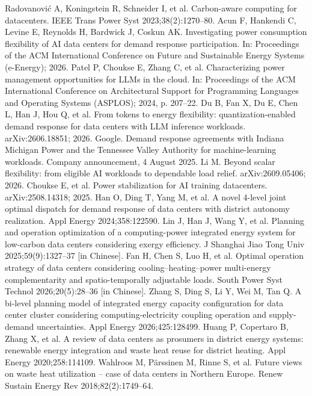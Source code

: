  Radovanovi\'c A, Koningstein R, Schneider I, et al. Carbon-aware computing for datacenters. IEEE Trans Power Syst 2023;38(2):1270--80.
 Acun F, Hankendi C, Levine E, Reynolds H, Bardwick J, Coskun AK. Investigating power consumption flexibility of AI data centers for demand response participation. In: Proceedings of the ACM International Conference on Future and Sustainable Energy Systems (e-Energy); 2026.
 Patel P, Choukse E, Zhang C, et al. Characterizing power management opportunities for LLMs in the cloud. In: Proceedings of the ACM International Conference on Architectural Support for Programming Languages and Operating Systems (ASPLOS); 2024, p. 207--22.
 Du B, Fan X, Du E, Chen L, Han J, Hou Q, et al. From tokens to energy flexibility: quantization-enabled demand response for data centers with LLM inference workloads. arXiv:2606.18851; 2026.
 Google. Demand response agreements with Indiana Michigan Power and the Tennessee Valley Authority for machine-learning workloads. Company announcement, 4 August 2025.
 Li M. Beyond scalar flexibility: from eligible AI workloads to dependable load relief. arXiv:2609.05406; 2026.
 Choukse E, et al. Power stabilization for AI training datacenters. arXiv:2508.14318; 2025.
 Han O, Ding T, Yang M, et al. A novel 4-level joint optimal dispatch for demand response of data centers with district autonomy realization. Appl Energy 2024;358:122590.
 Lin J, Han J, Wang Y, et al. Planning and operation optimization of a computing-power integrated energy system for low-carbon data centers considering exergy efficiency. J Shanghai Jiao Tong Univ 2025;59(9):1327--37 [in Chinese].
 Fan H, Chen S, Luo H, et al. Optimal operation strategy of data centers considering cooling--heating--power multi-energy complementarity and spatio-temporally adjustable loads. South Power Syst Technol 2026;20(5):28--36 [in Chinese].
 Zhang S, Ding S, Li Y, Wei M, Tan Q. A bi-level planning model of integrated energy capacity configuration for data center cluster considering computing-electricity coupling operation and supply-demand uncertainties. Appl Energy 2026;425:128499.
 Huang P, Copertaro B, Zhang X, et al. A review of data centers as prosumers in district energy systems: renewable energy integration and waste heat reuse for district heating. Appl Energy 2020;258:114109.
 Wahlroos M, P\"arssinen M, Rinne S, et al. Future views on waste heat utilization -- case of data centers in Northern Europe. Renew Sustain Energy Rev 2018;82(2):1749--64.
